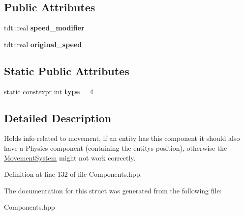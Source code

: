 \subsection*{Public Attributes}
\begin{DoxyCompactItemize}
\item 
tdt\+::real {\bfseries speed\+\_\+modifier}\hypertarget{struct_movement_component_afcb4440b43821b991b8f09825d00bc46}{}\label{struct_movement_component_afcb4440b43821b991b8f09825d00bc46}

\item 
tdt\+::real {\bfseries original\+\_\+speed}\hypertarget{struct_movement_component_aee69070da125d18a4d6439079ed398f9}{}\label{struct_movement_component_aee69070da125d18a4d6439079ed398f9}

\end{DoxyCompactItemize}
\subsection*{Static Public Attributes}
\begin{DoxyCompactItemize}
\item 
static constexpr int {\bfseries type} = 4\hypertarget{struct_movement_component_a5e597e875ec732aebb8005074236feec}{}\label{struct_movement_component_a5e597e875ec732aebb8005074236feec}

\end{DoxyCompactItemize}


\subsection{Detailed Description}
Holds info related to movement, if an entity has this component it should also have a Physics component (containing the entity\textquotesingle{}s position), otherwise the \hyperlink{class_movement_system}{Movement\+System} might not work correctly. 

Definition at line 132 of file Components.\+hpp.



The documentation for this struct was generated from the following file\+:\begin{DoxyCompactItemize}
\item 
Components.\+hpp\end{DoxyCompactItemize}
